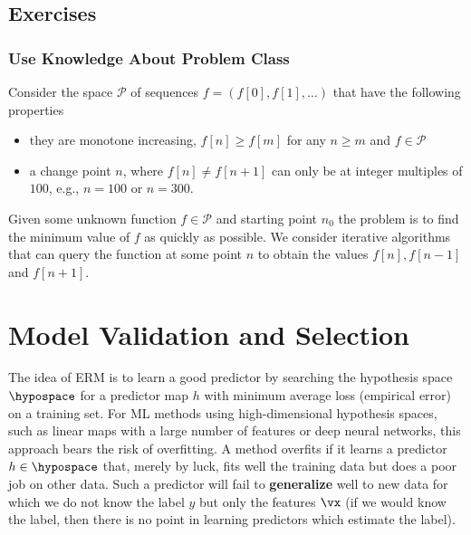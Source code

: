 \documentclass[12pt]{report}
\begin{document}
\section{Exercises}

\subsection{Use Knowledge About Problem Class} 
Consider the space $\mathcal{P}$ of sequences $f = (f[0],f[1],\ldots)$ that have the following properties 
\begin{itemize} 
	\item they are monotone increasing, $f[n] \geq f[m]$ for any $n \geq m$ and $f \in \mathcal{P}$
	\item a change point $n$, where $f[n] \neq f[n+1]$ can only be at integer multiples of $100$, 
	e.g., $n=100$ or $n=300$. 
\end{itemize} 
Given some unknown function $f \in \mathcal{P}$ and starting point $n_{0}$ the problem is to find 
the minimum value of $f$ as quickly as possible. We consider iterative algorithms that can query
the function at some point $n$ to obtain the values $f[n], f[n-1]$ and $f[n+1]$. 


\newpage
\chapter{Model Validation and Selection} 
\label{ch_validation_selection}
The idea of ERM is to learn a good predictor by searching the hypothesis space $\hypospace$ 
for a predictor map $h$ with minimum average loss (empirical error) on a training set. For ML 
methods using high-dimensional hypothesis spaces, such as linear maps with a large number of 
features or deep neural networks, this approach bears the risk of overfitting. A 
method overfits if it learns a predictor $h \in \hypospace$ that, merely by luck, fits 
well the training data but does a poor job on other data. Such a predictor will fail 
to {\bf generalize} well to new data for which we do not know the label $y$ but 
only the features $\vx$ (if we would know the label, then there is no point in learning 
predictors which estimate the label). 
\end{document}
